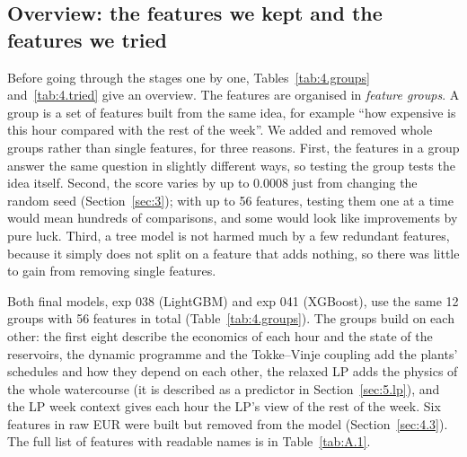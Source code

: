

\subsection{Overview: the features we kept and the features we tried}\label{sec:4.overview}

Before going through the stages one by one, Tables~\ref{tab:4.groups} and~\ref{tab:4.tried} give an overview. The features are organised in \emph{feature groups}. A group is a set of features built from the same idea, for example ``how expensive is this hour compared with the rest of the week''. We added and removed whole groups rather than single features, for three reasons. First, the features in a group answer the same question in slightly different ways, so testing the group tests the idea itself. Second, the score varies by up to 0.0008 just from changing the random seed (Section~\ref{sec:3}); with up to 56 features, testing them one at a time would mean hundreds of comparisons, and some would look like improvements by pure luck. Third, a tree model is not harmed much by a few redundant features, because it simply does not split on a feature that adds nothing, so there was little to gain from removing single features.

Both final models, exp 038 (LightGBM) and exp 041 (XGBoost), use the same 12 groups with 56 features in total (Table~\ref{tab:4.groups}). The groups build on each other: the first eight describe the economics of each hour and the state of the reservoirs, the dynamic programme and the Tokke--Vinje coupling add the plants' schedules and how they depend on each other, the relaxed LP adds the physics of the whole watercourse (it is described as a predictor in Section~\ref{sec:5.lp}), and the LP week context gives each hour the LP's view of the rest of the week. Six features in raw EUR were built but removed from the model (Section~\ref{sec:4.3}). The full list of features with readable names is in Table~\ref{tab:A.1}.

